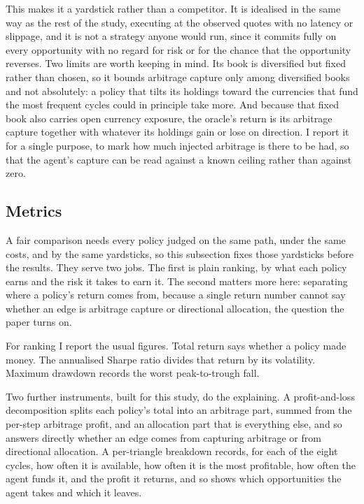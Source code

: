 \documentclass[12pt,a4paper]{article}
\begin{document}
This makes it a yardstick rather than a competitor. It is idealised in the same way as the rest of
the study, executing at the observed quotes with no latency or slippage, and it is not a strategy
anyone would run, since it commits fully on every opportunity with no regard for risk or for the
chance that the opportunity reverses. Two limits are worth keeping in mind. Its book is
diversified but fixed rather than chosen, so it bounds arbitrage capture only among diversified
books and not absolutely: a policy that tilts its holdings toward the currencies that fund the
most frequent cycles could in principle take more. And because that fixed book also carries open
currency exposure, the oracle's return is its arbitrage capture together with whatever its
holdings gain or lose on direction. I report it for a single purpose, to mark how much injected
arbitrage is there to be had, so that the agent's capture can be read against a known ceiling
rather than against zero.

\subsection{Metrics}

A fair comparison needs every policy judged on the same path, under the same costs, and by the
same yardsticks, so this subsection fixes those yardsticks before the results. They serve two
jobs. The first is plain ranking, by what each policy earns and the risk it takes to earn it. The
second matters more here: separating where a policy's return comes from, because a single return
number cannot say whether an edge is arbitrage capture or directional allocation, the question the
paper turns on.

For ranking I report the usual figures. Total return says whether a policy made money. The
annualised Sharpe ratio divides that return by its volatility. Maximum drawdown records the
worst peak-to-trough fall.

Two further instruments, built for this study, do the explaining. A profit-and-loss decomposition
splits each policy's total into an arbitrage part, summed from the per-step arbitrage profit, and
an allocation part that is everything else, and so answers directly whether an edge comes from
capturing arbitrage or from directional allocation. A per-triangle breakdown records, for each of
the eight cycles, how often it is available, how often it is the most profitable, how often the
agent funds it, and the profit it returns, and so shows which opportunities the agent takes and
which it leaves.
\end{document}
